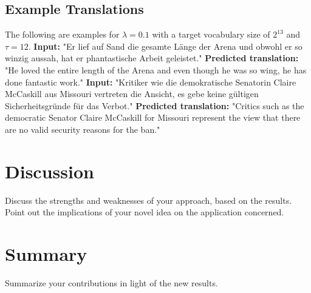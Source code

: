 \documentclass[11pt,a4paper]{article}
\begin{document}
\subsection{Example Translations}
The following are examples for $\lambda=0.1$ with a target vocabulary size of $2^{13}$ and $\tau=12$. \newline
\textbf{Input:} "Er lief auf Sand die gesamte Länge der Arena und obwohl er so winzig aussah, hat er phantastische Arbeit geleistet." \newline
\textbf{Predicted translation:} "He loved the entire length of the Arena and even though he was so wing, he has done fantastic work." \newline
\textbf{Input:} "Kritiker wie die demokratische Senatorin Claire McCaskill aus Missouri vertreten die Ansicht, es gebe keine gültigen Sicherheitsgründe für das Verbot." \newline
\textbf{Predicted translation:}  "Critics such as the democratic Senator Claire McCaskill for Missouri represent the view that there are no valid security reasons for the ban."

\section{Discussion}\label{sec:discussion}
Discuss the strengths and weaknesses of your approach, based on the results. Point out the implications of your novel idea on the application concerned.
\section{Summary}\label{sec:conclusions}
Summarize your contributions in light of the new results.

\end{document}
